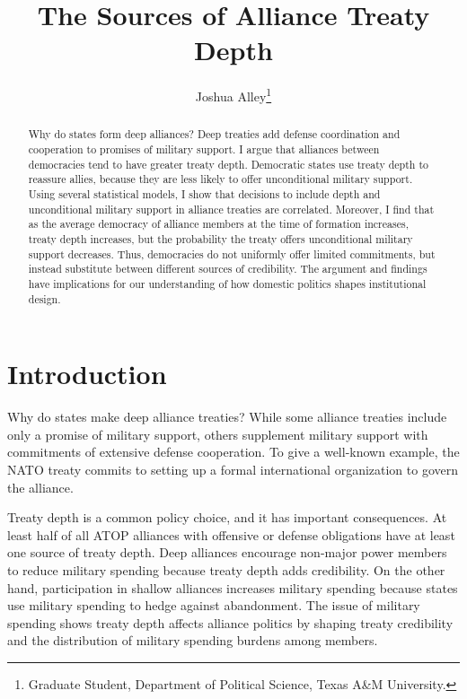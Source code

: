 \documentclass[12pt]{article}
\title{\textbf{The Sources of Alliance Treaty Depth}}
\author{Joshua Alley\footnote{Graduate Student,
Department of Political Science, Texas A\&M University.}}
\date{}
\begin{document}
\maketitle 

\doublespace 

\begin{abstract}
Why do states form deep alliances? 
Deep treaties add defense coordination and cooperation to promises of military support.
I argue that alliances between democracies tend to have greater treaty depth. 
Democratic states use treaty depth to reassure allies, because they are less likely to offer unconditional military support.
Using several statistical models, I show that decisions to include depth and unconditional military support in alliance treaties are correlated.
Moreover, I find that as the average democracy of alliance members at the time of formation increases, treaty depth increases, but the probability the treaty offers unconditional military support decreases. 
Thus, democracies do not uniformly offer limited commitments, but instead substitute between different sources of credibility. 
The argument and findings have implications for our understanding of how domestic politics shapes institutional design. 
\end{abstract}


\newpage 


\section{Introduction}


Why do states make deep alliance treaties? 
While some alliance treaties include only a promise of military support, others supplement military support with commitments of extensive defense cooperation. 
To give a well-known example, the NATO treaty commits to setting up a formal international organization to govern the alliance. 


Treaty depth is a common policy choice, and it has important consequences. 
At least half of all ATOP alliances with offensive or defense obligations have at least one source of treaty depth.
Deep alliances encourage non-major power members to reduce military spending because treaty depth adds credibility.  
On the other hand, participation in shallow alliances increases military spending because states use military spending to hedge against abandonment.
The issue of military spending shows treaty depth affects alliance politics by shaping treaty credibility and the distribution of military spending burdens among members. 
\end{document}
